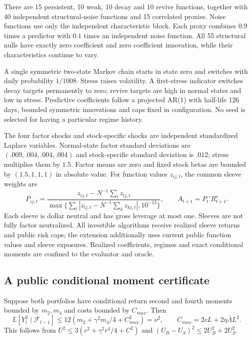 \documentclass[11pt,a4paper]{article}
\theoremstyle{remark}\newtheorem{remark}[theorem]{Remark}
\newcommand{\E}{\mathbb E}\newcommand{\Prb}{\mathbb P}
\newcommand{\F}{\mathcal F}\newcommand{\G}{\mathcal G}\newcommand{\W}{\mathcal W}
\begin{document}
There are 15 persistent, 10 weak, 10 decay and 10 revive functions, together
with 40 independent structural-noise functions and 15 correlated proxies.
Noise functions use only the independent characteristic block. Each proxy
combines $0.9$ times a predictor with $0.1$ times an independent noise
function. All 55 structural nulls have exactly zero coefficient and zero
coefficient innovation, while their characteristics continue to vary.

A single symmetric two-state Markov chain starts in state zero and switches
with daily probability $1/1008$. Stress raises volatility. A first-stress
indicator switches decay targets permanently to zero; revive targets are
high in normal states and low in stress. Predictive coefficients follow a
projected AR(1) with half-life 126 days, bounded symmetric innovations and
caps fixed in configuration. No seed is selected for having a particular
regime history.

The four factor shocks and stock-specific shocks are independent standardized
Laplace variables. Normal-state factor standard deviations are
$(.009,.004,.004,.004)$ and stock-specific standard deviation is $.012$;
stress multiplies them by $1.5$. Factor means are zero and fixed stock betas
are bounded by $(1.5,1,1,1)$ in absolute value. For function values $z_{ij,t}$,
the common sleeve weights are
\begin{equation}
 P_{ij,t}=\frac{z_{ij,t}-N^{-1}\sum_lz_{lj,t}}
 {\max\{\sum_l|z_{lj,t}-N^{-1}\sum_kz_{kj,t}|,10^{-12}\}},
 \qquad A_{t+1}=P_t'R^e_{t+1}.
\end{equation}
Each sleeve is dollar neutral and has gross leverage at most one. Sleeves are
not fully factor neutralized. All investible algorithms receive realized sleeve
returns and public risk caps; the extension additionally uses current public
function values and sleeve exposures. Realized coefficients, regimes and exact
conditional moments are confined to the evaluator and oracle.

\subsection{A public conditional moment certificate}
Suppose both portfolios have conditional return second and fourth moments
bounded by $m_2,m_4$ and costs bounded by $C_{max}$. Then
\begin{equation}
 \E[Y_t^2\mid\F_{t-1}]\le
 12(m_2+\gamma^2m_4/4+C_{max}^2)=\nu^2,\qquad
 C_{max}=2cL+2\eta\bar\Lambda L^2.\label{eq:envelope}
\end{equation}
This follows from $U^2\le3(r^2+\gamma^2r^4/4+C^2)$ and
$(U_B-U_S)^2\le2U_B^2+2U_S^2$.
\end{document}
